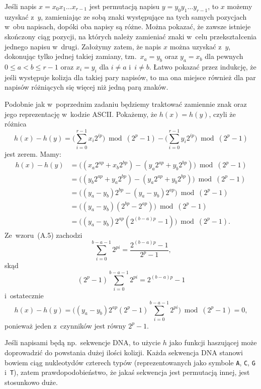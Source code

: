 \exercise %
Jeśli napis $x=x_0x_1\dots x_{r-1}$ jest permutacją napisu $y=y_0y_1\dots y_{r-1}$, to $x$ możemy uzyskać z~$y$, zamieniając ze sobą znaki występujące na tych samych pozycjach w~obu napisach, dopóki oba napisy są różne. Można pokazać, że zawsze istnieje skończony ciąg pozycji, na których należy zamieniać znaki w~celu przekształcenia jednego napisu w~drugi. Założymy zatem, że napis $x$ można uzyskać z~$y$, dokonując tylko jednej takiej zamiany, tzn.\ $x_a=y_b$ oraz $y_a=x_b$ dla pewnych $0\le a<b\le r-1$ oraz $x_i=y_i$ dla $i\ne a$ i~$i\ne b$. Łatwo pokazać przez indukcję, że jeśli występuje kolizja dla takiej pary napisów, to ma ona miejsce również dla par napisów różniących się więcej niż jedną parą znaków.

Podobnie jak w~poprzednim zadaniu będziemy traktować zamiennie znak oraz jego reprezentację w~kodzie ASCII\@. Pokażemy, że $h(x)=h(y)$, czyli że różnica
\[
	h(x)-h(y) = \biggl(\sum_{i=0}^{r-1}x_i2^{ip}\biggr)\bmod(2^p-1)-\biggl(\sum_{i=0}^{r-1}y_i2^{ip}\biggr)\bmod(2^p-1)
\]
jest zerem. Mamy:
\begin{align*}
	h(x)-h(y) &= \bigl((x_a2^{ap}+x_b2^{bp})-(y_a2^{ap}+y_b2^{bp})\bigr)\bmod(2^p-1) \\
	&= \bigl((y_b2^{ap}+y_a2^{bp})-(y_a2^{ap}+y_b2^{bp})\bigr)\bmod(2^p-1) \\
	&= \bigl((y_a-y_b)2^{bp}-(y_a-y_b)2^{ap}\bigr)\bmod(2^p-1) \\
	&= \bigl((y_a-y_b)(2^{bp}-2^{ap})\bigr)\bmod(2^p-1) \\
	&= \bigl((y_a-y_b)2^{ap}(2^{(b-a)p}-1)\bigr)\bmod(2^p-1).
\end{align*}
Ze~wzoru~(A.5) zachodzi
\[
	\sum_{i=0}^{b-a-1}2^{pi} = \frac{2^{(b-a)p}-1}{2^p-1},
\]
skąd
\[
	(2^p-1)\sum_{i=0}^{b-a-1}2^{pi} = 2^{(b-a)p}-1
\]
i~ostatecznie
\[
	h(x)-h(y) = \biggl((y_a-y_b)2^{ap}(2^p-1)\sum_{i=0}^{b-a-1}2^{pi}\biggr)\bmod(2^p-1) = 0,
\]
ponieważ jeden z~czynników jest równy $2^p-1$.

Jeśli napisami będą np.\ sekwencje DNA, to użycie $h$ jako funkcji haszującej może doprowadzić do powstania dużej ilości kolizji. Każda sekwencja DNA stanowi bowiem ciąg nukleotydów czterech typów (reprezentowanych jako symbole \texttt{A}, \texttt{C}, \texttt{G} i~\texttt{T}), zatem prawdopodobieństwo, że jakaś sekwencja jest permutacją innej, jest stosunkowo duże.

